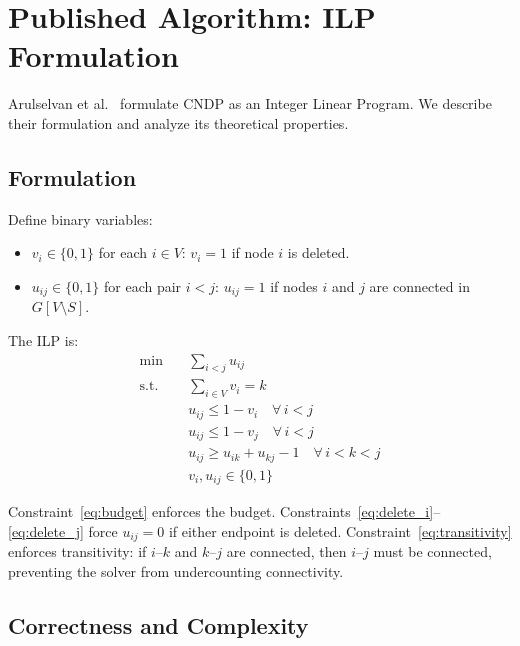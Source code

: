 \documentclass[11pt,a4paper]{article}
\begin{document}
\section{Published Algorithm: ILP Formulation}
\label{sec:ilp}

Arulselvan et al.~\cite{arulselvan2009} formulate CNDP as an Integer Linear Program. We describe their formulation and analyze its theoretical properties.

\subsection{Formulation}

Define binary variables:
\begin{itemize}
    \item $v_i \in \{0, 1\}$ for each $i \in V$: $v_i = 1$ if node $i$ is deleted.
    \item $u_{ij} \in \{0, 1\}$ for each pair $i < j$: $u_{ij} = 1$ if nodes $i$ and $j$ are connected in $G[V \setminus S]$.
\end{itemize}

The ILP is:
\begin{align}
    \min \quad & \sum_{i < j} u_{ij} \label{eq:ilp_obj} \\
    \text{s.t.} \quad & \sum_{i \in V} v_i = k \label{eq:budget} \\
    & u_{ij} \leq 1 - v_i \quad \forall\, i < j \label{eq:delete_i} \\
    & u_{ij} \leq 1 - v_j \quad \forall\, i < j \label{eq:delete_j} \\
    & u_{ij} \geq u_{ik} + u_{kj} - 1 \quad \forall\, i < k < j \label{eq:transitivity} \\
    & v_i, u_{ij} \in \{0, 1\} \label{eq:binary}
\end{align}

Constraint~\eqref{eq:budget} enforces the budget. Constraints~\eqref{eq:delete_i}--\eqref{eq:delete_j} force $u_{ij} = 0$ if either endpoint is deleted. Constraint~\eqref{eq:transitivity} enforces transitivity: if $i$--$k$ and $k$--$j$ are connected, then $i$--$j$ must be connected, preventing the solver from undercounting connectivity.

\subsection{Correctness and Complexity}
\end{document}
